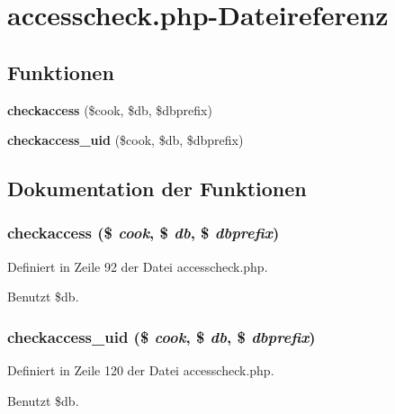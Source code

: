 \section{accesscheck.php-Dateireferenz}
\label{accesscheck_8php}
\subsection*{Funktionen}
\begin{CompactItemize}
\item 
{\bf checkaccess} (\$cook, \$db, \$dbprefix)
\item 
{\bf checkaccess\_\-uid} (\$cook, \$db, \$dbprefix)
\end{CompactItemize}


\subsection{Dokumentation der Funktionen}
\subsubsection{\setlength{\rightskip}{0pt plus 5cm}checkaccess (\$ {\em cook}, \$ {\em db}, \$ {\em dbprefix})}\label{accesscheck_8php_6a0c9e848420b634962ddb1f41ab7ccd}




Definiert in Zeile 92 der Datei accesscheck.php.

Benutzt \$db.
\subsubsection{\setlength{\rightskip}{0pt plus 5cm}checkaccess\_\-uid (\$ {\em cook}, \$ {\em db}, \$ {\em dbprefix})}\label{accesscheck_8php_0dd27a0f813f14c2c75d12c1ae5d9ac9}




Definiert in Zeile 120 der Datei accesscheck.php.

Benutzt \$db.